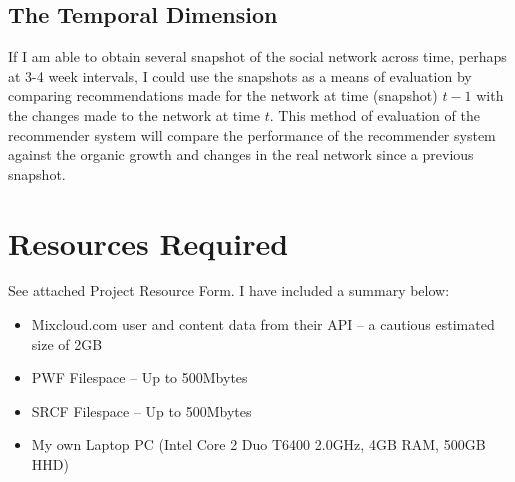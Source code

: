 

\subsection*{The Temporal Dimension}
If I am able to obtain several snapshot of the social network across time, perhaps at 3-4 week intervals, I could use the snapshots as a means of evaluation by comparing recommendations made for the network at time (snapshot) $t-1$ with the changes made to the network at time $t$. This method of evaluation of the recommender system will compare the performance of the recommender system against the organic growth and changes in the real network since a previous snapshot.


\section{Resources Required}
See attached Project Resource Form. I have included a summary below:
\begin{itemize}
\item Mixcloud.com user and content data from their API -- a cautious estimated size of 2GB
\item PWF Filespace -- Up to 500Mbytes
\item SRCF Filespace  -- Up to 500Mbytes
\item My own Laptop PC (Intel Core 2 Duo T6400 2.0GHz, 4GB RAM, 500GB HHD)
\end{itemize}

